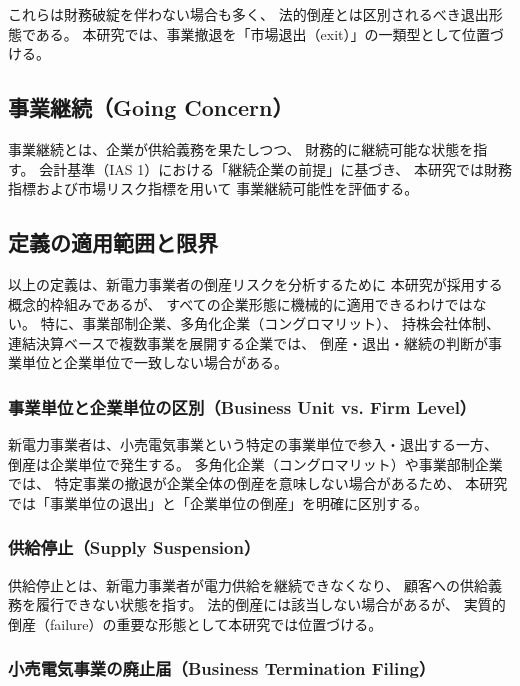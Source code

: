 これらは財務破綻を伴わない場合も多く、
法的倒産とは区別されるべき退出形態である。
本研究では、事業撤退を「市場退出（exit）」の一類型として位置づける。

\subsection{事業継続（Going Concern）}

事業継続とは、企業が供給義務を果たしつつ、
財務的に継続可能な状態を指す。
会計基準（IAS 1）における「継続企業の前提」に基づき、
本研究では財務指標および市場リスク指標を用いて
事業継続可能性を評価する。


\subsection{定義の適用範囲と限界}

以上の定義は、新電力事業者の倒産リスクを分析するために
本研究が採用する概念的枠組みであるが、
すべての企業形態に機械的に適用できるわけではない。
特に、事業部制企業、多角化企業（コングロマリット）、
持株会社体制、連結決算ベースで複数事業を展開する企業では、
倒産・退出・継続の判断が事業単位と企業単位で一致しない場合がある。

\subsubsection{事業単位と企業単位の区別（Business Unit vs. Firm Level）}

新電力事業者は、小売電気事業という特定の事業単位で参入・退出する一方、
倒産は企業単位で発生する。
多角化企業（コングロマリット）や事業部制企業では、
特定事業の撤退が企業全体の倒産を意味しない場合があるため、
本研究では「事業単位の退出」と「企業単位の倒産」を明確に区別する。

\subsubsection{供給停止（Supply Suspension）}

供給停止とは、新電力事業者が電力供給を継続できなくなり、
顧客への供給義務を履行できない状態を指す。
法的倒産には該当しない場合があるが、
実質的倒産（failure）の重要な形態として本研究では位置づける。

\subsubsection{小売電気事業の廃止届（Business Termination Filing）}

